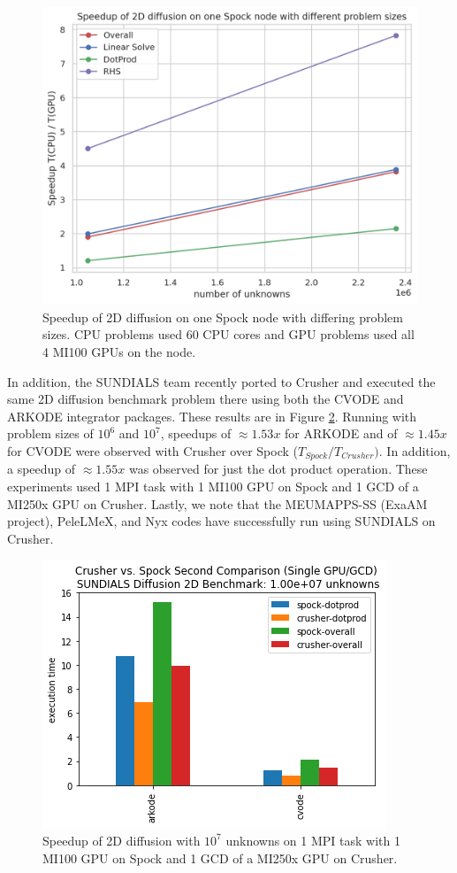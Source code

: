 \begin{figure}[htb]
	\centering
	\includegraphics[width=0.6\linewidth]{projects/2.3.3-MathLibs/2.3.3.12-SUNDIALS-hypre/SpockResults-Dec2021.png}
	\caption{\label{fig:sun-spock-12-21} Speedup of 2D diffusion on one Spock node with differing problem sizes.  CPU problems used 60 CPU cores and GPU problems used all 4 MI100 GPUs on the node.}
\end{figure}

In addition, the SUNDIALS team recently ported to Crusher and executed the same 2D diffusion benchmark problem there using both the CVODE and ARKODE integrator packages.  
These results are in Figure \ref{fig:sun-crusher-spock-2-22}.
Running with problem sizes of $10^6$ and $10^7$, speedups of $\approx 1.53x$ for ARKODE and of $\approx 1.45x$ for CVODE were observed with Crusher over Spock ($T_{Spock} / T_{Crusher}).$  In addition, a speedup of $\approx 1.55x$ was observed for just the dot product operation.  These experiments used 1 MPI task with 1 MI100 GPU on Spock and 1 GCD of a MI250x GPU on Crusher.  Lastly, we note that the MEUMAPPS-SS (ExaAM project), PeleLMeX, and Nyx codes have successfully run using SUNDIALS on Crusher.

\begin{figure}[htb]
	\centering
	\includegraphics[width=0.6\linewidth]{projects/2.3.3-MathLibs/2.3.3.12-SUNDIALS-hypre/crusher-spock-1e7-Feb2022.png}
	\caption{\label{fig:sun-crusher-spock-2-22} Speedup of 2D diffusion with $10^7$ unknowns on 1 MPI task with 1 MI100 GPU on Spock and 1 GCD of a MI250x GPU on Crusher.}
\end{figure}

